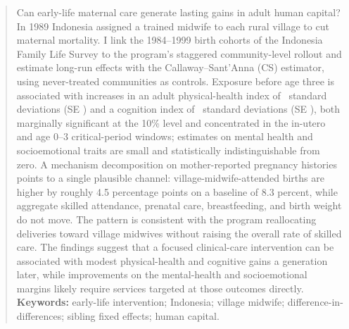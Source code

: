 




\maketitle

\begin{abstract} \noindent Can early-life maternal care generate lasting gains in adult human capital? In 1989 Indonesia assigned a trained midwife to each rural village to cut maternal mortality. I link the 1984--1999 birth cohorts of the Indonesia Family Life Survey to the program's staggered community-level rollout and estimate long-run effects with the Callaway--Sant'Anna (CS) estimator, using never-treated communities as controls. Exposure before age three is associated with increases in an adult physical-health index of \CoefHealthCS\ standard deviations (SE \SEHealthCS) and a cognition index of \CoefCogCS\ standard deviations (SE \SECogCS), both marginally significant at the 10\% level and concentrated in the in-utero and age 0--3 critical-period windows; estimates on mental health and socioemotional traits are small and statistically indistinguishable from zero. A mechanism decomposition on mother-reported pregnancy histories points to a single plausible channel: village-midwife-attended births are higher by roughly 4.5 percentage points on a baseline of 8.3 percent, while aggregate skilled attendance, prenatal care, breastfeeding, and birth weight do not move. The pattern is consistent with the program reallocating deliveries toward village midwives without raising the overall rate of skilled care. The findings suggest that a focused clinical-care intervention can be associated with modest physical-health and cognitive gains a generation later, while improvements on the mental-health and socioemotional margins likely require services targeted at those outcomes directly.\\

\noindent \textbf{Keywords:} early-life intervention; Indonesia; village midwife; difference-in-differences; sibling fixed effects; human capital. \end{abstract}

\newpage           

\newpage
\printbibliography[title={References}]

\appendix 


